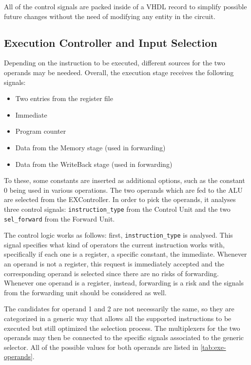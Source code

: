 All of the control signals are packed inside of a VHDL record to simplify possible future changes without the need of
modifying any entity in the circuit.

\subsection{Execution Controller and Input Selection}
Depending on the instruction to be executed, different sources for the two operands may be needeed. Overall, the
execution stage receives the following signals:
\begin{itemize}
    \item Two entries from the register file
    \item Immediate
    \item Program counter
    \item Data from the Memory stage (used in forwarding)
    \item Data from the WriteBack stage (used in forwarding)
\end{itemize}
To these, some constants are inserted as additional options, such as the constant 0 being used in various operations.
The two operands which are fed to the ALU are selected from the EXController. In order to
pick the operands, it analyses three control signals: \texttt{instruction\_type} from the Control Unit and the two
\texttt{sel\_forward} from the Forward Unit.

The control logic works as follows: first, \texttt{instruction\_type} is analysed. This signal specifies what kind of
operators the current instruction works with, specifically if each one is a register, a specific constant,
the immediate. Whenever an operand is not a register, this request is immediately accepted and the corresponding
operand is selected since there are no risks of forwarding. Whenever one operand is a register, instead, forwarding is
a risk and the signals from the forwarding unit should be considered as well.

The candidates for operand 1 and 2 are not necessarily the same, so they are categorized in a generic way that allows
all the supported instructions to be executed but still optimized the selection process. The multiplexers for the two
operands may then be connected to the specific signals associated to the generic selector.
All of the possible values for both operands are listed in \autoref{tab:exe-operands}.


